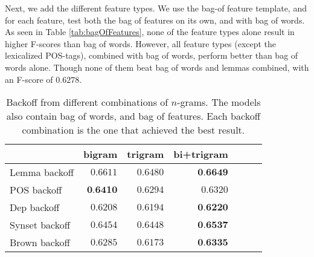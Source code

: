 \documentclass[11pt,letterpaper]{article}
\begin{document}
Next, we add the different feature types. We use the bag-of feature template, and for each feature, test both the bag of features on its own, and with bag of words. As seen in Table \ref{tab:bagOfFeatures}, none of the feature types alone result in higher F-scores than bag of words. However, all feature types (except the lexicalized POS-tags), combined with bag of words, perform better than bag of words alone. Though none of them beat bag of words and lemmas combined, with an F-score of $0.6278$.

\begin{table}
  \begin{center}
    \begin{tabular}{lrrrrrr}
      \toprule

      & bigram & trigram & bi+trigram \\
      \midrule
      Lemma backoff & $0.6611$ & $0.6480$ &  $\textbf{0.6649}$ \\ 
      POS backoff & $\textbf{0.6410}$ & $0.6294$ & $0.6320$ \\
      Dep backoff & $0.6208$ & $0.6194$ & $\textbf{0.6220}$ \\
      Synset backoff & $0.6454$ & $0.6448$ &  $\textbf{0.6537}$\\
      Brown backoff & $0.6285$ &  $0.6173$  & $\textbf{0.6335}$\\
      
      
      \bottomrule

    \end{tabular}
  \end{center}
  \caption{Backoff from different combinations of $n$-grams. The models also contain bag of words, and bag of features. Each backoff combination is the one that achieved the best result.}
  \label{tab:ngrambackoff}
\end{table}
\end{document}
